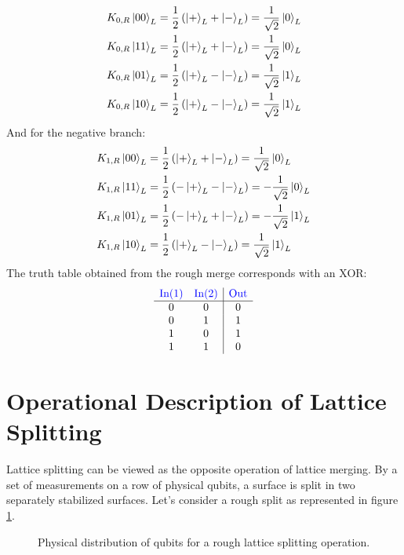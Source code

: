 \documentclass[12pt, twoside, openany]{book}
\begin{document}
\begin{align*}
K_{0,R}\ket{00}_L &= \frac{1}{2}\left(\ket{+}_L + \ket{-}_L\right) = \frac{1}{\sqrt{2}}\ket{0}_L \\
K_{0,R}\ket{11}_L &= \frac{1}{2}\left(\ket{+}_L + \ket{-}_L\right) = \frac{1}{\sqrt{2}}\ket{0}_L \\
K_{0,R}\ket{01}_L &= \frac{1}{2}\left(\ket{+}_L - \ket{-}_L\right) = \frac{1}{\sqrt{2}}\ket{1}_L \\
K_{0,R}\ket{10}_L &= \frac{1}{2}\left(\ket{+}_L - \ket{-}_L\right) = \frac{1}{\sqrt{2}}\ket{1}_L
\end{align*}
And for the negative branch:
\begin{align*}
K_{1,R}\ket{00}_L &= \frac{1}{2}\left(\ket{+}_L + \ket{-}_L\right) = \frac{1}{\sqrt{2}}\ket{0}_L \\
K_{1,R}\ket{11}_L &= \frac{1}{2}\left(-\ket{+}_L - \ket{-}_L\right) = -\frac{1}{\sqrt{2}}\ket{0}_L \\
K_{1,R}\ket{01}_L &= \frac{1}{2}\left(-\ket{+}_L + \ket{-}_L\right) = -\frac{1}{\sqrt{2}}\ket{1}_L \\
K_{1,R}\ket{10}_L &= \frac{1}{2}\left(\ket{+}_L - \ket{-}_L\right) = \frac{1}{\sqrt{2}}\ket{1}_L
\end{align*}
The truth table obtained from the rough merge corresponds with an XOR:
\[
\begin{array}{cc|c}
\textcolor{blue}{\text{In}(1)} & \textcolor{blue}{\text{In}(2)} & \textcolor{blue}{\text{Out}} \\
\hline
0 & 0 & 0 \\
0 & 1 & 1 \\
1 & 0 & 1 \\
1 & 1 & 0 \\
\end{array}
\]

\section{Operational Description of Lattice Splitting}

Lattice splitting can be viewed as the opposite operation of lattice merging. By a set of measurements on a row of physical qubits, a surface is split in two separately stabilized surfaces. Let's consider a rough split as represented in figure \ref{fig:rough_splitting}.

\begin{figure} [ht]
    \centering
    
    \caption{Physical distribution of qubits for a rough lattice splitting operation.}
    \label{fig:rough_splitting}
\end{figure}
\end{document}
